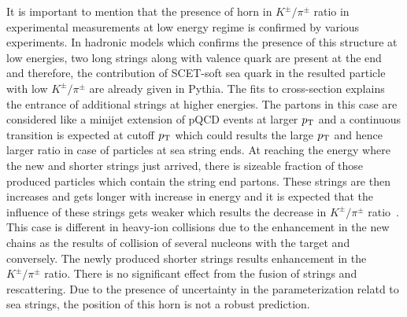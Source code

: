 \documentclass{article}
\newcommand{\ppt}{$p_{\rm T}$}
\begin{document}
It is important to mention that the presence of horn in $K^\pm/\pi^\pm$ ratio in experimental measurements at low energy regime is confirmed by various experiments. In hadronic models which confirms the presence of this structure at low energies, two long strings along with valence quark are present at the end and therefore, the contribution of SCET-soft sea quark in the resulted particle with low $K^\pm/\pi^\pm$ are already given in Pythia. The fits to cross-section explains the entrance of additional strings at higher energies. The partons in this case are considered like a minijet extension of pQCD events at larger {\ppt} and a continuous transition is expected at cutoff {\ppt} which could results the large {\ppt} and hence larger ratio in case of particles at sea string ends. At reaching the energy where the new and shorter strings just arrived, there is sizeable fraction of those produced particles which contain the string end partons. These strings are then increases  and gets longer with increase in energy and it is expected that the influence of these strings gets weaker which results the decrease in $K^\pm/\pi^\pm$ ratio~\cite{Bhattacharyya:2017rmc}. This case is different in heavy-ion collisions due to the enhancement in the new chains as the results of collision of several nucleons with the target and conversely. The newly produced shorter strings results enhancement in the $K^\pm/\pi^\pm$ ratio. There is no significant effect from the fusion of strings and rescattering. Due to the presence of uncertainty in the parameterization relatd to sea strings, the position of this horn is not a robust prediction.  
\end{document}
